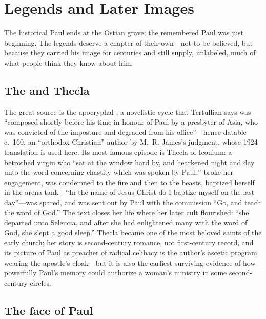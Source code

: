 \section{Legends and Later Images}

The historical Paul ends at the Ostian grave; the remembered Paul was just
beginning. The legends deserve a chapter of their own---not to be
believed, but because they carried his image for centuries and still
supply, unlabeled, much of what people think they know about him.

\subsection{The  and Thecla}

The great source is the apocryphal , a novelistic cycle
that Tertullian says was ``composed shortly before his time in honour of
Paul by a presbyter of Asia, who was convicted of the imposture and
degraded from his office''---hence datable c.~160, an ``orthodox
Christian'' author by M.~R. James's judgment, whose 1924 translation is
used here. Its most famous episode is Thecla of Iconium: a betrothed
virgin who ``sat at the window hard by, and hearkened night and day unto
the word concerning chastity which was spoken by Paul,'' broke her
engagement, was condemned to the fire and then to the beasts, baptized
herself in the arena tank---``In the name of Jesus Christ do I baptize
myself on the last day''---was spared, and was sent out by Paul with the
commission ``Go, and teach the word of God.'' The text closes her life
where her later cult flourished: ``she departed unto Seleucia, and after
she had enlightened many with the word of God, she slept a good sleep.''
Thecla became one of the most beloved saints of the early church; her
story is second-century romance, not first-century record, and its
picture of Paul as preacher of radical celibacy is the author's ascetic
program wearing the apostle's cloak---but it is also the earliest surviving
evidence of how powerfully Paul's memory could authorize a woman's
ministry in some second-century circles.

\subsection{The face of Paul}

